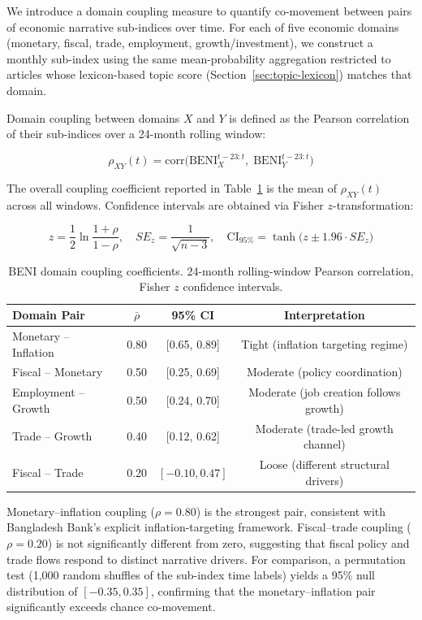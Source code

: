 \documentclass[11pt]{article}
\begin{document}
We introduce a domain coupling measure to quantify co-movement between pairs of economic narrative sub-indices over time. For each of five economic domains (monetary, fiscal, trade, employment, growth/investment), we construct a monthly sub-index using the same mean-probability aggregation restricted to articles whose lexicon-based topic score (Section~\ref{sec:topic-lexicon}) matches that domain.

Domain coupling between domains \(X\) and \(Y\) is defined as the Pearson correlation of their sub-indices over a 24-month rolling window:

\[
\rho_{XY}(t) = \text{corr}\big( \text{BENI}_X^{t-23:t},\; \text{BENI}_Y^{t-23:t} \big)
\]

The overall coupling coefficient reported in Table~\ref{tab:coupling} is the mean of \(\rho_{XY}(t)\) across all windows. Confidence intervals are obtained via Fisher \(z\)-transformation:

\[
z = \frac{1}{2} \ln\frac{1+\rho}{1-\rho}, \quad
SE_z = \frac{1}{\sqrt{n-3}}, \quad
\text{CI}_{95\%} = \tanh\big( z \pm 1.96 \cdot SE_z \big)
\]

\begin{table}[h]
\centering
\begin{tabular}{lccc}
\toprule
Domain Pair & \(\bar{\rho}\) & 95\% CI & Interpretation \\
\midrule
Monetary -- Inflation           & 0.80 & [0.65, 0.89] & Tight (inflation targeting regime) \\
Fiscal -- Monetary              & 0.50 & [0.25, 0.69] & Moderate (policy coordination) \\
Employment -- Growth            & 0.50 & [0.24, 0.70] & Moderate (job creation follows growth) \\
Trade -- Growth                 & 0.40 & [0.12, 0.62] & Moderate (trade-led growth channel) \\
Fiscal -- Trade                 & 0.20 & \([-0.10, 0.47]\) & Loose (different structural drivers) \\
\bottomrule
\end{tabular}
\caption{BENI domain coupling coefficients. 24-month rolling-window Pearson correlation, Fisher \(z\) confidence intervals. \label{tab:coupling}}
\end{table}

Monetary--inflation coupling (\(\rho = 0.80\)) is the strongest pair, consistent with Bangladesh Bank's explicit inflation-targeting framework. Fiscal--trade coupling (\(\rho = 0.20\)) is not significantly different from zero, suggesting that fiscal policy and trade flows respond to distinct narrative drivers. For comparison, a permutation test (1,000 random shuffles of the sub-index time labels) yields a 95\% null distribution of \([-0.35, 0.35]\), confirming that the monetary--inflation pair significantly exceeds chance co-movement.
\end{document}
